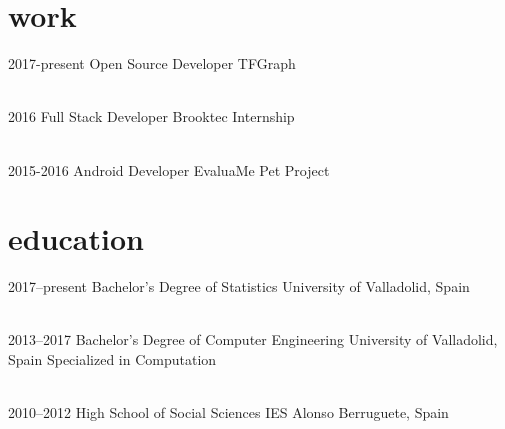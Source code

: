 \documentclass[]{friggeri-cv} %
\begin{document}

    \section{work}

        \begin{entrylist}

            \entry
            {2017-present}
            {Open Source Developer}
            {TFGraph}
            {}

            \\
            \entry
            {2016}
            {Full Stack Developer}
            {Brooktec}
            {Internship}

            \\
            \entry
            {2015-2016}
            {Android Developer}
            {EvaluaMe}
            {Pet Project}

        \end{entrylist}




    \section{education}

        \begin{entrylist}

            \entry
            {2017--present}
            {Bachelor's Degree {\normalfont of Statistics}}
            {University of Valladolid, Spain}
            {}

            \\
            \entry
            {2013--2017}
            {Bachelor's Degree {\normalfont of Computer Engineering}}
            {University of Valladolid, Spain}
            {Specialized in Computation}

            \\
            \entry
            {2010--2012}
            {High School {\normalfont of Social Sciences}}
            {IES Alonso Berruguete, Spain}
            {}

        \end{entrylist}
\end{document}
